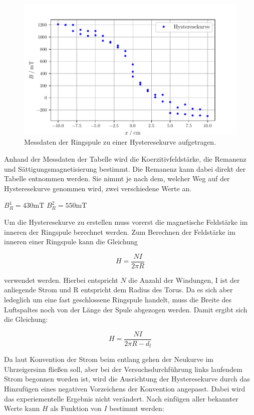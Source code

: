 \begin{figure}
  \centering
  \includegraphics[width=\textwidth]{build/Hysteresekurve.pdf}
  \caption{Messdaten der Ringspule zu einer Hysteresekurve aufgetragen.}\label{fig:hysterese}
\end{figure}

Anhand der Messdaten der Tabelle wird die Koerzitivfeldstärke, die Remanenz
und Sättigungsmagnetisierung bestimmt.
Die Remanenz kann dabei direkt der Tabelle entnommen werden. Sie nimmt je nach dem, welcher Weg 
auf der Hysteresekurve genommen wird, zwei verschiedene Werte an.

\quad $B_{R}^1=430 \si{\milli\tesla}$ 
\quad $B_{R}^2=550 \si{\milli\tesla}$

Um die Hysteresekurve zu erstellen muss vorerst die magnetische Feldstärke im inneren der Ringspule berechnet werden.
Zum Berechnen der Feldstärke im inneren einer Ringspule kann die Gleichung 

\begin{equation}
H=\frac{NI}{2\pi R}
\end{equation}

verwendet werden. Hierbei entspricht $N$ die Anzahl der Windungen, I ist der anliegende Strom und 
R entspricht dem Radius des Torus. Da es sich aber ledeglich um eine fast geschlossene Ringspule handelt, muss die Breite des Luftspaltes
noch von der Länge der Spule abgezogen werden. Damit ergibt sich die Gleichung:

\begin{equation}
H=\frac{NI}{2\pi R-d_l}
\end{equation}

Da laut Konvention der Strom beim entlang gehen der Neukurve im Uhrzeigersinn fließen soll, aber 
bei der Versuchsdurchführung links laufendem Strom begonnen worden ist, wird die Ausrichtung der Hysteresekurve
durch das Hinzufügen eines negativen Vorzeichens der Konvention angepasst. Dabei wird das experiementelle
Ergebnis nicht verändert.
Nach einfügen aller bekannter Werte kann $H$ als Funktion von $I$ bestimmt werden:

